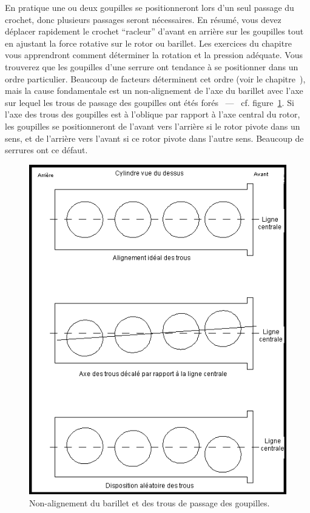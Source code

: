 \documentclass[a4paper,french,11pt,twoside]{report}
\begin{document}
En pratique une ou deux goupilles se positionneront lors d'un seul passage du crochet, donc plusieurs passages seront nécessaires. En résumé, vous devez déplacer rapidement le crochet \enquote{racleur} d'avant en arrière sur les goupilles tout en ajustant la force rotative sur le rotor ou barillet. Les exercices du chapitre~ vous apprendront comment déterminer la rotation et la pression adéquate. Vous trouverez que les goupilles d'une serrure ont tendance à se positionner dans un ordre particulier. Beaucoup de facteurs déterminent cet ordre (voir le chapitre~), mais la cause fondamentale est un non-alignement de l'axe du barillet avec l'axe sur lequel les trous de passage des goupilles ont étés forés ~---~ cf. figure~\ref{non-alignement}. Si l'axe des trous des goupilles est à l'oblique par rapport à l'axe central du rotor, les goupilles se positionneront de l'avant vers l'arrière si le rotor pivote dans un sens, et de l'arrière vers l'avant si ce rotor pivote dans l'autre sens. Beaucoup de serrures ont ce défaut.

\begin{figure}[h]
  \begin{center}
    \includegraphics[scale=0.7]{images/Image15}
    \caption{Non-alignement du barillet et des trous de passage des goupilles.\label{non-alignement}}
  \end{center}
\end{figure}
\end{document}
